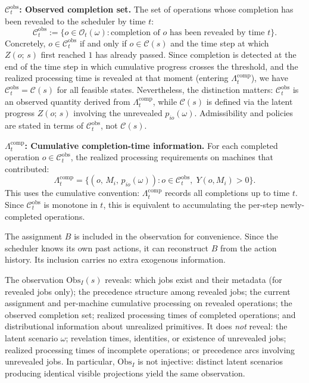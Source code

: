 \medskip
\noindent\textbf{$\mathcal{C}_t^{\mathrm{obs}}$: Observed completion set.} The set of
operations whose completion has been revealed to the scheduler by time $t$:
\[
\mathcal{C}_t^{\mathrm{obs}} := \{o \in \mathcal{O}_t(\omega) :
\text{completion of } o \text{ has been revealed by time } t\}.
\]
Concretely, $o \in \mathcal{C}_t^{\mathrm{obs}}$ if and only if $o \in \mathcal{C}(s)$
and the time step at which $Z(o;\,s)$ first reached $1$ has already passed. Since
completion is detected at the end of the time step in which cumulative progress crosses
the threshold, and the realized processing time is revealed at that moment (entering
$\Lambda_t^{\mathrm{comp}}$), we have $\mathcal{C}_t^{\mathrm{obs}} = \mathcal{C}(s)$
for all feasible states. Nevertheless, the distinction matters: $\mathcal{C}_t^{\mathrm{obs}}$
is an observed quantity derived from $\Lambda_t^{\mathrm{comp}}$, while $\mathcal{C}(s)$
is defined via the latent progress $Z(o;\,s)$ involving the unrevealed $p_{io}(\omega)$.
Admissibility and policies are stated in terms of $\mathcal{C}_t^{\mathrm{obs}}$, not
$\mathcal{C}(s)$.

\medskip
\noindent\textbf{$\Lambda_t^{\mathrm{comp}}$: Cumulative completion-time information.}
For each completed operation $o \in \mathcal{C}_t^{\mathrm{obs}}$, the realized
processing requirements on machines that contributed:
\[
\Lambda_t^{\mathrm{comp}} = \bigl\{(o,\, M_i,\, p_{io}(\omega)) :
o \in \mathcal{C}_t^{\mathrm{obs}},\; Y(o, M_i) > 0\bigr\}.
\]
This uses the cumulative convention: $\Lambda_t^{\mathrm{comp}}$ records all completions
up to time $t$. Since $\mathcal{C}_t^{\mathrm{obs}}$ is monotone in $t$, this is
equivalent to accumulating the per-step newly-completed operations.

\begin{remark}[Redundancy of $B$]
The assignment $B$ is included in the observation for convenience. Since the scheduler
knows its own past actions, it can reconstruct $B$ from the action history. Its
inclusion carries no extra exogenous information.
\end{remark}

\begin{remark}
The observation $\mathrm{Obs}_I(s)$ reveals: which jobs exist and their metadata (for
revealed jobs only); the precedence structure among revealed jobs; the current assignment
and per-machine cumulative processing on revealed operations; the observed completion
set; realized processing times of completed operations; and distributional information
about unrealized primitives. It does \emph{not} reveal: the latent scenario $\omega$;
revelation times, identities, or existence of unrevealed jobs; realized processing times
of incomplete operations; or precedence arcs involving unrevealed jobs. In particular,
$\mathrm{Obs}_I$ is not injective: distinct latent scenarios producing identical visible
projections yield the same observation.
\end{remark}

